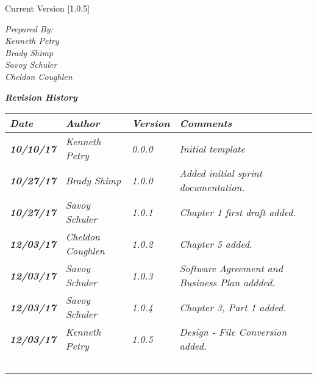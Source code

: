 


Current Version [1.0.5]
\vspace*{5mm}

{\color{SDColor5}
\noindent
\textit{Prepared By:}\\
\textit{Kenneth Petry}\\
\textit{Brady Shimp}\\
\textit{Savoy Schuler}\\
\textit{Cheldon Coughlen}
}

\vfill
\noindent
{\color{SDColor3} \textit{\textbf{Revision History}}}\\
\begin{tabular}{|>{\raggedright}p{1.5cm}|>{\raggedright}p{3cm}|>{\raggedright}p{1.5cm}|>{\raggedright}p{9cm}|}
  \hline
  \textit{\textbf{Date}} &  \textit{\textbf{Author}} & \textit{\textbf{Version}} & \textit{\textbf{Comments}}\tabularnewline
  \hline
  \textit{\textbf{10/10/17}} & \textit{Kenneth Petry} & \textit{0.0.0} & \textit{Initial template}\tabularnewline\hline
  \textit{\textbf{10/27/17}} & \textit{Brady Shimp} & \textit{1.0.0} & \textit{Added initial sprint documentation.}\tabularnewline\hline
  \textit{\textbf{10/27/17}} & \textit{Savoy Schuler} & \textit{1.0.1} & \textit{Chapter 1 first draft added.}\tabularnewline\hline
  \textit{\textbf{12/03/17}} & \textit{Cheldon Coughlen} & \textit{1.0.2} & \textit{Chapter 5 added.}\tabularnewline\hline
  \textit{\textbf{12/03/17}} & \textit{Savoy Schuler} & \textit{1.0.3} & \textit{Software Agreement and Business Plan addded.}\tabularnewline\hline
  \textit{\textbf{12/03/17}} & \textit{Savoy Schuler} & \textit{1.0.4} & \textit{Chapter 3, Part 1 added.}\tabularnewline\hline
  \textit{\textbf{12/03/17}} & \textit{Kenneth Petry} & \textit{1.0.5} & \textit{Design - File Conversion added.}\tabularnewline\hline
  &  &  & \tabularnewline
  \hline
  &  &  & \tabularnewline
  \hline
  &  &  & \tabularnewline
  \hline
  &  &  & \tabularnewline
  \hline
  &  &  & \tabularnewline
  \hline
\end{tabular}
\vfill

